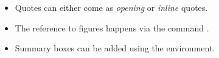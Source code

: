 \begin{multicols}{2}
\begin{tcolorbox}[arc=0pt,outer arc=0pt,breakable,title = Summary,
colback=clrt2!30,colframe=clrt2,pad at break=3mm,boxrule=1pt]
   \begin{itemize}[leftmargin=1em]
   \setlength{\itemsep}{0em}
    \item{Quotes can either come as \textit{opening} or \textit{inline} quotes.}
    \item{The reference to figures happens via the command .}
    \item{Summary boxes can be added using the  environment.}
\end{itemize}
\end{tcolorbox}

\end{multicols}
